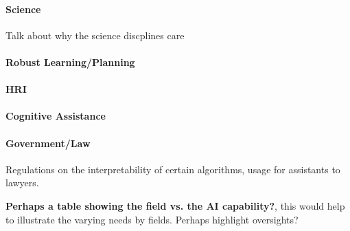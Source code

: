     \paragraph{Science} Talk about why the science discplines care
    \paragraph{Robust Learning/Planning}
    \paragraph{HRI}
    \paragraph{Cognitive Assistance} 
    \paragraph{Government/Law} Regulations on the interpretability of certain algorithms, usage for assistants to lawyers.

    \textbf{Perhaps a table showing the field vs. the AI capability?}, this would help to illustrate the varying needs by fields. Perhaps highlight oversights?

